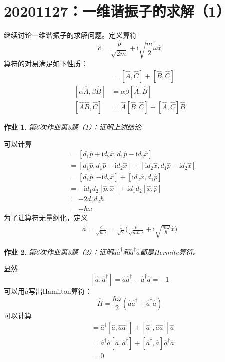 \documentclass[12pt]{article}
\newtheorem{asg}{作业}
\begin{document}
    \section{20201127：一维谐振子的求解（1）}

    继续讨论一维谐振子的求解问题。定义算符
    \[ \hat{c} = \frac {\hat{p}}{\sqrt{2m}} + \mathrm{i}\sqrt{\frac m2}\omega \hat{x} \]
    算符的对易满足如下性质：
    \begin{align*}
        [\hat{A}+\hat{B},\hat{C}] &= [\hat{A},\hat{C}]+[\hat{B},\hat{C}]\\
        [\alpha \hat{A}, \beta \hat{B}] &= \alpha \beta [\hat{A},\hat{B}]\\
        [\hat{A}\hat{B},\hat{C}] &= \hat{A}[\hat{B},\hat{C}] + [\hat{A},\hat{C}]\hat{B}
    \end{align*}
    \begin{asg}
        第6次作业第3题（1）：证明上述结论
    \end{asg}
    可以计算
    \begin{align*}
        [\hat{c},\hat{c}^\dagger] &= [d_1\hat{p} +\mathrm{i}d_2\hat{x}, d_1\hat{p} - \mathrm{i}d_2\hat{x}]\\
        &= [d_1\hat{p}, d_1\hat{p} - \mathrm{i}d_2\hat{x}] + [\mathrm{i}d_2\hat{x}, d_1\hat{p} - \mathrm{i}d_2\hat{x}]\\
        &= [d_1\hat{p}, -\mathrm{i}d_2\hat{x}] + [\mathrm{i}d_2\hat{x}, d_1\hat{p}]\\
        &= -\mathrm{i}d_1d_2[\hat{p},\hat{x}] + \mathrm{i}d_1d_2[\hat{x},\hat{p}]\\
        &= -2d_1d_2\hbar\\
        &= -\hbar \omega
    \end{align*}
    为了让算符无量纲化，定义
    \begin{align*}
        \hat{a} = \frac {\hat{c}}{\sqrt{\hbar \omega}} =\frac 1{\sqrt{2}} \bigg(\frac {\hat{p}}{\sqrt{m\hbar\omega}} + \mathrm{i}\sqrt{\frac {m\omega}{\hbar}} \hat{x}\bigg)
    \end{align*}
    \begin{asg}
        第6次作业第3题（2）：证明$\hat{a}\hat{a}^\dagger$和$\hat{a}^\dagger\hat{a}$都是Hermite算符。
    \end{asg}
    显然
    \[ [\hat{a},\hat{a}^\dagger] = \hat{a}\hat{a}^\dagger - \hat{a}^\dagger \hat{a} =  -1 \]
    可以用$\hat{a}$写出Hamilton算符：
    \[ \hat{H} = \frac {\hbar \omega}2 (\hat{a}\hat{a}^\dagger + \hat{a}^\dagger \hat{a}) \]
    可以计算
    \begin{align*}
        [\hat{a}^\dagger\hat{a}, \hat{a}\hat{a}^\dagger] &= \hat{a}^\dagger [\hat{a},\hat{a}\hat{a}^\dagger] +  [\hat{a}^\dagger,\hat{a}\hat{a}^\dagger]\hat{a}\\
        &= \hat{a}^\dagger\hat{a}[\hat{a},\hat{a}^\dagger] + [\hat{a}^\dagger,\hat{a}]\hat{a}^\dagger \hat{a}\\
        &= 0
    \end{align*}
\end{document}
